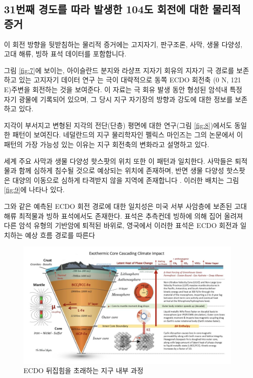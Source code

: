 \documentclass[10pt,twocolumn,letterpaper]{article}
\begin{document}
\subsection{31번째 경도를 따라 발생한 104도 회전에 대한 물리적 증거}


이 회전 방향을 뒷받침하는 물리적 증거에는 고지자기, 판구조론, 사막, 생물 다양성, 고대 해류, 빙하 표석 데이터를 포함합니다.

그림 \ref{fig:7}에 보이는, 아이슬란드 분지와 라샹프 지자기 회유의 지자기 극 경로를 보존하고 있는 고지자기 데이터 연구 \cite{35}는 극이 대략적으로 동쪽 ECDO 회전축 (0 N, 121 E)주변을 회전하는 것을 보여준다. 이 자료는 극 회유 발생 동안 형성된 암석내 특정 자기 광물에 기록되어 있으며, 그 당시 지구 자기장의 방향과 강도에 대한 정보를 보존하고 있다.

지각이 부서지고 변형된 지각의 전단(단층) 평면에 대한 연구(그림 \ref{fig:8})에서도  동일한 패턴이 보여진다. 네덜란드의 지구 물리학자인 펠릭스 마인즈는 그의 논문에서 \cite{36} 이 패턴의 가장 가능성 있는 이유는 지구 회전축의 변화라고 설명하고 있다.

세계 주요 사막과 생물 다양성 핫스팟의 위치 또한 이 패턴과 일치한다. 사막들은 퇴적물과 함께 심하게 침수될 것으로 예상되는 위치에 존재하며, 반면 생물 다양성 핫스팟은 대양의 이동으로 심하게 타격받지 않을 지역에 존재합니다 \cite{28}. 이러한 배치는 그림 \ref{fig:9}에 나타나 있다.

그와 같은 예측된 ECDO 회전 경로에 대한 일치성은  미국 서부 사암층에 보존된 고대 해류 최적물과 빙하 표석에서도 존재한다. 표석은 추측컨데 빙하에 의해 집어 올려져 다른 암석 유형의 기반암에 퇴적된 바위로,  영국에서 이러한 표석은  ECDO 회전과 일치하는 예상 흐름 경로를 따른다 \cite{67,68}

\begin{figure}[b]
\begin{center}
\includegraphics[width=1\textwidth]{layers.jpg}
\end{center}
   \caption{ECDO 뒤집힘을 초래하는 지구 내부 과정 \cite{129}}
\label{fig:11}
\end{figure}
\end{document}
